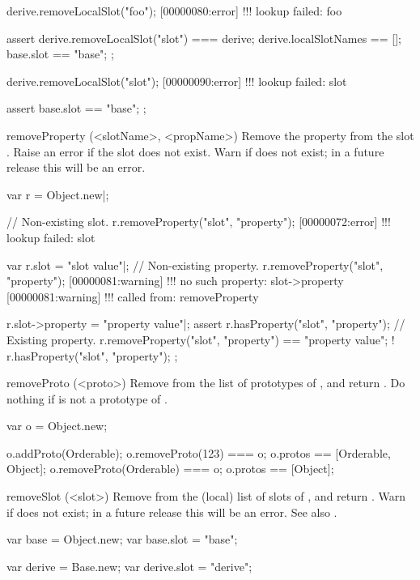\begin{urbiscriptapi}
\begin{urbiscript}
derive.removeLocalSlot("foo");
[00000080:error] !!! lookup failed: foo

assert
{
  derive.removeLocalSlot("slot") === derive;
  derive.localSlotNames == [];
  base.slot == "base";
};

derive.removeLocalSlot("slot");
[00000090:error] !!! lookup failed: slot

assert
{
  base.slot == "base";
};
\end{urbiscript}


\item[removeProperty](<slotName>, <propName>)%
  Remove the property  from the slot .  Raise an
  error if the slot does not exist.  Warn if  does not exist;
  in a future release this will be an error.
\begin{urbiscript}
var r = Object.new|;

// Non-existing slot.
r.removeProperty("slot", "property");
[00000072:error] !!! lookup failed: slot

var r.slot = "slot value"|;
// Non-existing property.
r.removeProperty("slot", "property");
[00000081:warning] !!! no such property: slot->property
[00000081:warning] !!!    called from: removeProperty

r.slot->property = "property value"|;
assert
{
  r.hasProperty("slot", "property");
  // Existing property.
  r.removeProperty("slot", "property") == "property value";
  ! r.hasProperty("slot", "property");
};
\end{urbiscript}

\item[removeProto](<proto>)%
  Remove  from the list of prototypes of \this, and return \this.
  Do nothing if  is not a prototype of \this.
\begin{urbiassert}
var o = Object.new;

o.addProto(Orderable);
o.removeProto(123) === o;
o.protos == [Orderable, Object];
o.removeProto(Orderable) === o;
o.protos == [Object];
\end{urbiassert}

\item[removeSlot](<slot>)%
  Remove  from the (local) list of slots of \this, and return
  \this.  Warn if  does not exist; in a future release this will
  be an error.  See also .
\begin{urbiassert}
var base = Object.new;
var base.slot = "base";

var derive = Base.new;
var derive.slot = "derive";


\end{urbiassert}
\end{urbiscriptapi}

